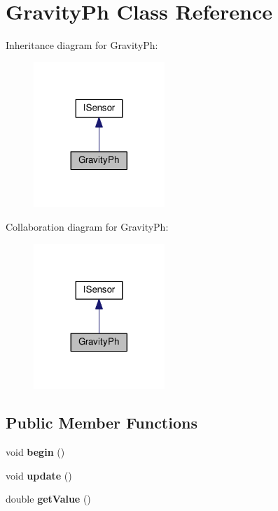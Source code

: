 \hypertarget{class_gravity_ph}{}\section{Gravity\+Ph Class Reference}
\label{class_gravity_ph}


Inheritance diagram for Gravity\+Ph\+:\nopagebreak
\begin{figure}[H]
\begin{center}
\leavevmode
\includegraphics[width=140pt]{class_gravity_ph__inherit__graph}
\end{center}
\end{figure}


Collaboration diagram for Gravity\+Ph\+:\nopagebreak
\begin{figure}[H]
\begin{center}
\leavevmode
\includegraphics[width=140pt]{class_gravity_ph__coll__graph}
\end{center}
\end{figure}
\subsection*{Public Member Functions}
\begin{DoxyCompactItemize}
\item 
void {\bfseries begin} ()\hypertarget{class_gravity_ph_a15c06b3c63d098a3b413e5cc97beb547}{}\label{class_gravity_ph_a15c06b3c63d098a3b413e5cc97beb547}

\item 
void {\bfseries update} ()\hypertarget{class_gravity_ph_a3661f2d7ae52fcdcc7cde674e9a1e213}{}\label{class_gravity_ph_a3661f2d7ae52fcdcc7cde674e9a1e213}

\item 
double {\bfseries get\+Value} ()\hypertarget{class_gravity_ph_a12f9ad86776c01409e0e3d4e3ab46178}{}\label{class_gravity_ph_a12f9ad86776c01409e0e3d4e3ab46178}

\end{DoxyCompactItemize}

